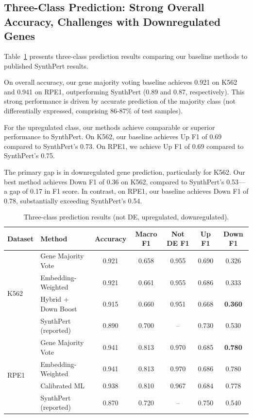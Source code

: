 \documentclass[11pt]{article}
\begin{document}
\subsection{Three-Class Prediction: Strong Overall Accuracy, Challenges with Downregulated Genes}

Table~\ref{tab:threeclass_results} presents three-class prediction results comparing our baseline methods to published SynthPert results.

On overall accuracy, our gene majority voting baseline achieves 0.921 on K562 and 0.941 on RPE1, outperforming SynthPert (0.89 and 0.87, respectively). This strong performance is driven by accurate prediction of the majority class (not differentially expressed, comprising 86-87\% of test samples).

For the upregulated class, our methods achieve comparable or superior performance to SynthPert. On K562, our baseline achieves Up F1 of 0.69 compared to SynthPert's 0.73. On RPE1, we achieve Up F1 of 0.69 compared to SynthPert's 0.75.

The primary gap is in downregulated gene prediction, particularly for K562. Our best method achieves Down F1 of 0.36 on K562, compared to SynthPert's 0.53---a gap of 0.17 in F1 score. In contrast, on RPE1, our baseline achieves Down F1 of 0.78, substantially exceeding SynthPert's 0.54.

\begin{table}[h]
\centering
\caption{Three-class prediction results (not DE, upregulated, downregulated).}
\label{tab:threeclass_results}
\begin{tabular}{llccccc}
\toprule
Dataset & Method & Accuracy & Macro F1 & Not DE F1 & Up F1 & Down F1 \\
\midrule
\multirow{4}{*}{K562}
& Gene Majority Vote & 0.921 & 0.658 & 0.955 & 0.690 & 0.326 \\
& Embedding-Weighted & 0.921 & 0.661 & 0.955 & 0.686 & 0.333 \\
& Hybrid + Down Boost & 0.915 & 0.660 & 0.951 & 0.668 & \textbf{0.360} \\
& SynthPert (reported) & 0.890 & 0.700 & -- & 0.730 & 0.530 \\
\midrule
\multirow{4}{*}{RPE1}
& Gene Majority Vote & 0.941 & 0.813 & 0.970 & 0.685 & \textbf{0.780} \\
& Embedding-Weighted & 0.941 & 0.813 & 0.970 & 0.686 & 0.780 \\
& Calibrated ML & 0.938 & 0.810 & 0.967 & 0.684 & 0.778 \\
& SynthPert (reported) & 0.870 & 0.720 & -- & 0.750 & 0.540 \\
\bottomrule
\end{tabular}
\end{table}
\end{document}
